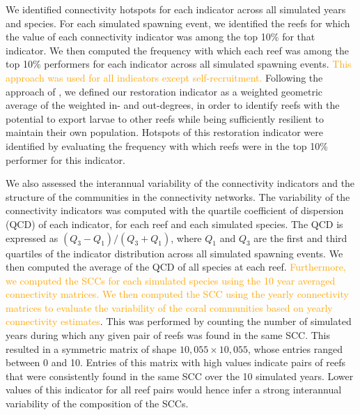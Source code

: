 \documentclass[preprint,12pt,authoryear]{elsarticle}
\newcommand{\added}[1]{\textcolor{orange}{#1}}
\begin{document}
	We identified connectivity hotspots for each indicator across all simulated years and species. For each simulated spawning event, we identified the reefs for which the value of each connectivity indicator was among the top 10\% for that indicator. We then computed the frequency with which each reef was among the top 10\% performers for each indicator across all simulated spawning events. \added{This approach was used for all indicators except self-recruitment.} Following the approach of \cite{tnc2024}, we defined our restoration indicator as a weighted geometric average of the weighted in- and out-degrees, in order to identify reefs with the potential to export larvae to other reefs while being sufficiently resilient to maintain their own population. Hotspots of this restoration indicator were identified by evaluating the frequency with which reefs were in the top 10\% performer for this indicator.
	
	We also assessed the interannual variability of the connectivity indicators and the structure of the communities in the connectivity networks. The variability of the connectivity indicators was computed with the quartile coefficient of dispersion (QCD) of each indicator, for each reef and each simulated species. The QCD is expressed as $(Q_3-Q_1) / (Q_3+Q_1)$, where $Q_1$ and $Q_3$ are the first and third quartiles of the indicator distribution across all simulated spawning events. We then computed the average of the QCD of all species at each reef. \added{Furthermore, we computed the SCCs for each simulated species using the 10 year averaged connectivity matrices. We then computed the SCC using the yearly connectivity matrices to evaluate the variability of the coral communities based on yearly connectivity estimates}. This was performed by counting the number of simulated years during which any given pair of reefs was found in the same SCC. This resulted in a symmetric matrix of shape $10,055 \times 10,055$, whose entries ranged between 0 and 10. Entries of this matrix with high values indicate pairs of reefs that were consistently found in the same SCC over the 10 simulated years. Lower values of this indicator for all reef pairs would hence infer a strong interannual variability of the composition of the SCCs.
	
\end{document}
